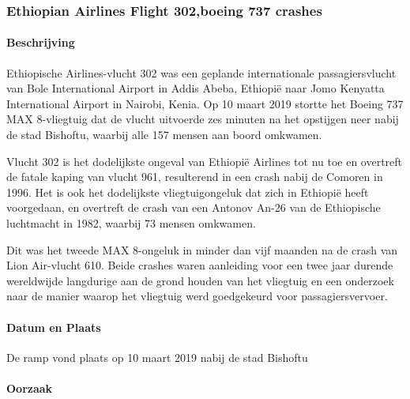 \documentclass{article}
\begin{document}
	\subsubsection{Ethiopian Airlines Flight 302,boeing 737 crashes}
	
	\paragraph{Beschrijving}
	
	Ethiopische Airlines-vlucht 302 was een geplande internationale passagiersvlucht van Bole International Airport in Addis Abeba, Ethiopië naar Jomo Kenyatta International Airport in Nairobi, Kenia. Op 10 maart 2019 stortte het Boeing 737 MAX 8-vliegtuig dat de vlucht uitvoerde zes minuten na het opstijgen neer nabij de stad Bishoftu, waarbij alle 157 mensen aan boord omkwamen.
	
	Vlucht 302 is het dodelijkste ongeval van Ethiopië Airlines tot nu toe en overtreft de fatale kaping van vlucht 961, resulterend in een crash nabij de Comoren in 1996. Het is ook het dodelijkste vliegtuigongeluk dat zich in Ethiopië heeft voorgedaan, en overtreft de crash van een Antonov An-26 van de Ethiopische luchtmacht in 1982, waarbij 73 mensen omkwamen.
	
	Dit was het tweede MAX 8-ongeluk in minder dan vijf maanden na de crash van Lion Air-vlucht 610. Beide crashes waren aanleiding voor een twee jaar durende wereldwijde langdurige aan de grond houden van het vliegtuig en een onderzoek naar de manier waarop het vliegtuig werd goedgekeurd voor passagiersvervoer.
	\paragraph{Datum en Plaats} De ramp vond plaats op  10 maart  2019 nabij de stad Bishoftu
	
	
	\paragraph{Oorzaak}
	
\end{document}
